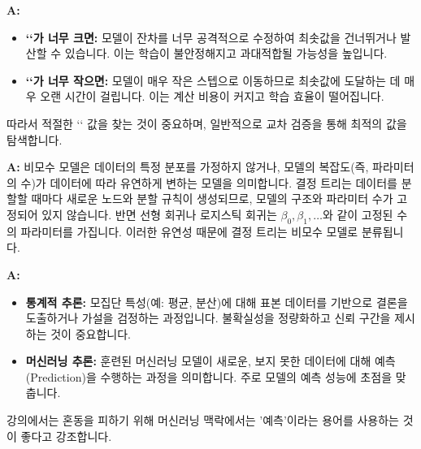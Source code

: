 \documentclass[11pt,a4paper]{article}
\begin{document}
\begin{tcolorbox}[colback=myblue!10, colframe=blue!50!black, title=\textbf{Q: 학습률(`\lambda`)이 너무 크거나 작으면 모델 학습에 어떤 문제가 발생하나요?}]
\textbf{A:}
\begin{itemize}
    \item \textbf{`\lambda`가 너무 크면:} 모델이 잔차를 너무 공격적으로 수정하여 최솟값을 건너뛰거나 발산할 수 있습니다. 이는 학습이 불안정해지고 과대적합될 가능성을 높입니다.
    \item \textbf{`\lambda`가 너무 작으면:} 모델이 매우 작은 스텝으로 이동하므로 최솟값에 도달하는 데 매우 오랜 시간이 걸립니다. 이는 계산 비용이 커지고 학습 효율이 떨어집니다.
\end{itemize}
따라서 적절한 `\lambda` 값을 찾는 것이 중요하며, 일반적으로 교차 검증을 통해 최적의 값을 탐색합니다.
\end{tcolorbox}

\begin{tcolorbox}[colback=myblue!10, colframe=blue!50!black, title=\textbf{Q: 결정 트리가 왜 비모수 모델(Non-parametric Model)인가요?}]
\textbf{A:} 비모수 모델은 데이터의 특정 분포를 가정하지 않거나, 모델의 복잡도(즉, 파라미터의 수)가 데이터에 따라 유연하게 변하는 모델을 의미합니다. 결정 트리는 데이터를 분할할 때마다 새로운 노드와 분할 규칙이 생성되므로, 모델의 구조와 파라미터 수가 고정되어 있지 않습니다. 반면 선형 회귀나 로지스틱 회귀는 $\beta_0, \beta_1, \dots$와 같이 고정된 수의 파라미터를 가집니다. 이러한 유연성 때문에 결정 트리는 비모수 모델로 분류됩니다.
\end{tcolorbox}

\begin{tcolorbox}[colback=myblue!10, colframe=blue!50!black, title=\textbf{Q: 머신러닝에서 '추론(Inference)'이라는 용어는 통계적 추론과 어떻게 다른가요?}]
\textbf{A:}
\begin{itemize}
    \item \textbf{통계적 추론:} 모집단 특성(예: 평균, 분산)에 대해 표본 데이터를 기반으로 결론을 도출하거나 가설을 검정하는 과정입니다. 불확실성을 정량화하고 신뢰 구간을 제시하는 것이 중요합니다.
    \item \textbf{머신러닝 추론:} 훈련된 머신러닝 모델이 새로운, 보지 못한 데이터에 대해 예측(Prediction)을 수행하는 과정을 의미합니다. 주로 모델의 예측 성능에 초점을 맞춥니다.
\end{itemize}
강의에서는 혼동을 피하기 위해 머신러닝 맥락에서는 '예측'이라는 용어를 사용하는 것이 좋다고 강조합니다.
\end{tcolorbox}
\end{document}
